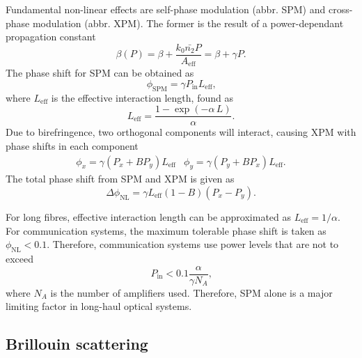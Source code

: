 \documentclass{standalone}
\begin{document}
Fundamental non-linear effects are self-phase modulation (abbr. SPM) and cross-phase modulation (abbr. XPM). The former is the result of a power-dependant propagation constant
\begin{equation}
\beta(P) = \beta + \frac{k_0 \bar{n_2} P}{A_\textrm{eff}} = \beta + \gamma P \textrm{.}
\end{equation}
The phase shift for SPM can be obtained as
\begin{equation}
\phi_\textrm{SPM} = \gamma P_\textrm{in} L_\textrm{eff} \textrm{,}
\end{equation}
where $L_\textrm{eff}$ is the effective interaction length, found as
\begin{equation}
L_\textrm{eff} = \frac{1 - \exp\left(-\alpha \, L\right)}{\alpha} \textrm{.}
\end{equation}
Due to birefringence, two orthogonal components will interact, causing XPM with phase shifts in each component
\begin{eqnarray}
\phi_x = \gamma \left(P_x + B P_y\right) L_\textrm{eff} & \phi_y = \gamma \left( P_y + B P_x \right) L_\textrm{eff} \textrm{.}
\end{eqnarray}
The total phase shift from SPM and XPM is given as
\begin{equation}
\varDelta \phi_\textrm{NL} = \gamma L_\textrm{eff} \left(1 - B\right) \left(P_x - P_y\right) \textrm{.}
\end{equation}

For long fibres, effective interaction length can be approximated as $L_\textrm{eff} = 1/\alpha$. For communication systems, the maximum tolerable phase shift is taken as $\phi_\textrm{NL} < 0.1$. Therefore, communication systems use power levels that are not to exceed
\begin{equation}
P_\textrm{in} < 0.1 \frac{\alpha}{\gamma N_A} \textrm{,}
\end{equation}
where $N_A$ is the number of amplifiers used. Therefore, SPM alone is a major limiting factor in long-haul optical systems.


\subsection{Brillouin scattering}
\end{document}
